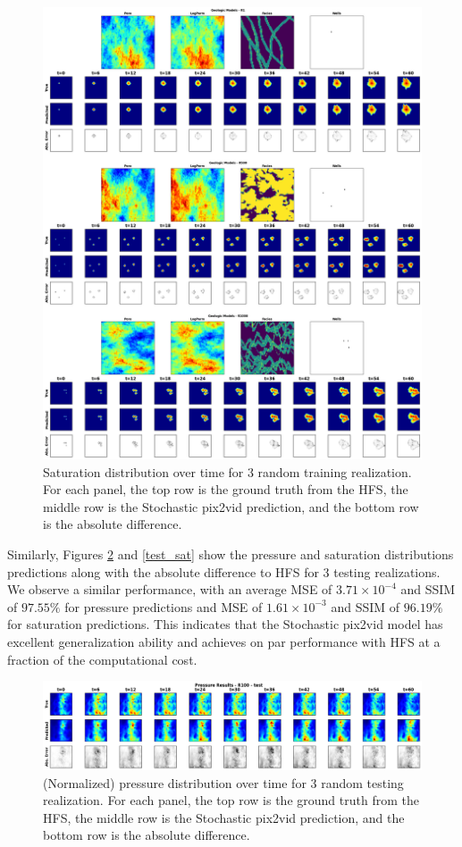 \documentclass[10pt, twoside]{article}
\begin{document}
\begin{figure}
    \centering
    \includegraphics[width=16cm]{figures/train_sat.png}
    \caption{Saturation distribution over time for 3 random training realization. For each panel, the top row is the ground truth from the HFS, the middle row is the Stochastic pix2vid prediction, and the bottom row is the absolute difference.}
    \label{train_sat}
\end{figure}

Similarly, Figures \ref{test_pres} and \ref{test_sat} show the pressure and saturation distributions predictions along with the absolute difference to HFS for 3 testing realizations. We observe a similar performance, with an average MSE of $3.71\times10^{-4}$ and SSIM of $97.55\%$ for pressure predictions and MSE of $1.61\times10^{-3}$ and SSIM of $96.19\%$ for saturation predictions. This indicates that the Stochastic pix2vid model has excellent generalization ability and achieves on par performance with HFS at a fraction of the computational cost.

\begin{figure}
    \centering
    \includegraphics[width=16cm]{figures/test_pres.png}
    \caption{(Normalized) pressure distribution over time for 3 random testing realization. For each panel, the top row is the ground truth from the HFS, the middle row is the Stochastic pix2vid prediction, and the bottom row is the absolute difference.}
    \label{test_pres}
\end{figure}
\end{document}
